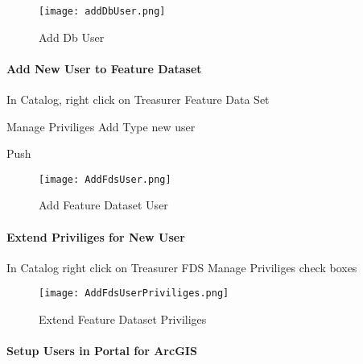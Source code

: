 \vspace{.35in}

 \begin{figure}[h!]
 \centering
     \texttt{[image: addDbUser.png]}
 \caption{Add Db User}
 \end{figure}
 \clearpage
 \paragraph[Add New User to Feature Dataset]{\Large Add New User to Feature Dataset\texorpdfstring{\\}{}}
 \vspace{.35in}

 In Catalog, { \rtArrow} right click on Treasurer Feature Data Set
 \vspace{.15in}

 {\rtArrow} Manage { \rtArrow} Priviliges { \rtArrow} Add { \rtArrow} Type new user { \rtArrow}

\vspace{.25in}

{\btn Push }
 \vspace{.25in}

 \begin{figure}[h!]
 \centering
     \texttt{[image: AddFdsUser.png]}
 \caption{Add Feature Dataset User}
 \end{figure}
 \clearpage
 \paragraph[Extend Priviliges for New User]{\Large Extend Priviliges for New User\texorpdfstring{\\}{}}
 \vspace{.5in}

 In Catalog {\rtArrow} right click on Treasurer FDS {\rtArrow} Manage {\rtArrow} Priviliges {\rtArrow} check boxes
 \vspace{.5in}

 \begin{figure}[h!]
 \centering
     \texttt{[image: AddFdsUserPriviliges.png]}
 \caption{Extend Feature Dataset Priviliges}
 \end{figure}
 \clearpage
 \paragraph[Setup Users in Portal for ArcGIS]{\Large Setup Users in Portal for ArcGIS\texorpdfstring{\\}{}}
 \vspace{.5in}


